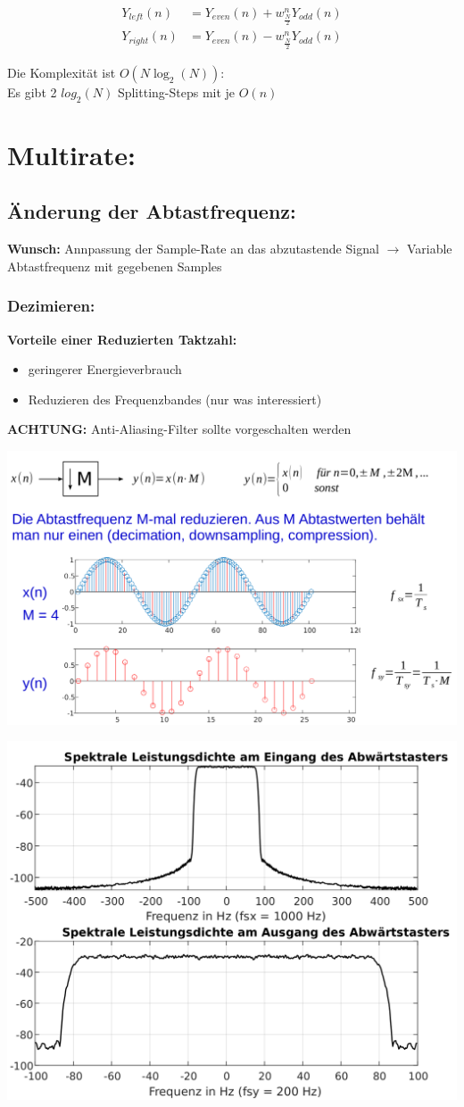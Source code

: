 \documentclass[10pt,a4paper]{article}
\begin{document}
  \begin{mdframed}[style=exercise]
    \begin{align}
        Y_{left}(n) &= Y_{even}(n) + w_{\frac{N}{2}}^{n} Y_{odd}(n)\\ 
        Y_{right}(n) &= Y_{even}(n) - w_{\frac{N}{2}}^{n} Y_{odd}(n)
    \end{align}
  \end{mdframed}
Die Komplexität ist $O(N\log_2(N))$:\\ 
Es gibt 2 $log_2(N)$ Splitting-Steps mit je $O(n)$
\newpage

\section{Multirate:}

\subsection{Änderung der Abtastfrequenz:}
\textbf{Wunsch: } Annpassung der Sample-Rate an das abzutastende Signal  
$\rightarrow$ Variable Abtastfrequenz mit gegebenen Samples
\subsubsection{Dezimieren:}
\textbf{Vorteile einer Reduzierten Taktzahl: }
\begin{itemize}
  \item geringerer Energieverbrauch 
  \item Reduzieren des Frequenzbandes (\grqq{}nur was interessiert\grqq{})
\end{itemize}

\textbf{ACHTUNG: } Anti-Aliasing-Filter sollte vorgeschalten werden
\begin{center}
  \includegraphics[width=.4\textwidth]{./img/Multirate_Dezimator.png}
\end{center} 
\begin{center}
  \includegraphics[width=.5\textwidth]{./img/Dezimator_Spektrum.png}
\end{center} 
\end{document}
